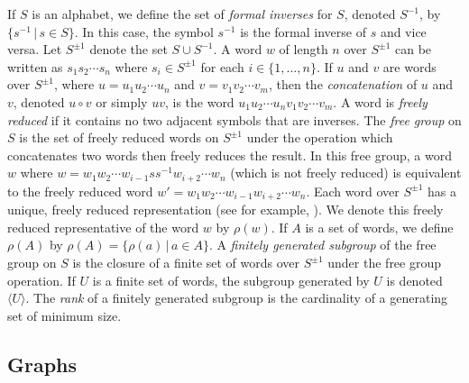 \documentclass{article}
\newcommand{\gen}[1]{\langle #1 \rangle}
\newcommand{\Spm}{S^{\pm1}}
\begin{document}
If $S$ is an alphabet, we define the set of \emph{formal inverses} for $S$, denoted $S^{-1}$, by $\{ s^{-1} \,|\, s \in S \}$.
In this case, the symbol $s^{-1}$ is the formal inverse of $s$ and vice versa.
Let $\Spm$ denote the set $S \cup S^{-1}$.
A word $w$ of length $n$ over $\Spm$ can be written as $s_1s_2\cdots s_n$ where $s_i \in \Spm$ for each $i \in \{1, \dotsc, n\}$.
If $u$ and $v$ are words over $\Spm$, where $u = u_1 u_2 \dotsb u_n$ and $v = v_1 v_2 \dotsb v_m$, then the \emph{concatenation} of $u$ and $v$, denoted $u \circ v$ or simply $uv$, is the word $u_1 u_2 \cdots u_n v_1 v_2 \cdots v_m$.
A word is \emph{freely reduced} if it contains no two adjacent symbols that are inverses.
The \emph{free group} on $S$ is the set of freely reduced words on $\Spm$ under the operation which concatenates two words then freely reduces the result.
In this free group, a word $w$ where $w = w_1 w_2 \cdots w_{i - 1} s s^{-1} w_{i + 2} \cdots w_n$ (which is not freely reduced) is equivalent to the freely reduced word $w' = w_1 w_2 \cdots w_{i - 1} w_{i + 2} \cdots w_n$.
Each word over $\Spm$ has a unique, freely reduced representation (see for example, \cite[Section~I.1]{ls77}).
We denote this freely reduced representative of the word $w$ by $\rho(w)$.
If $A$ is a set of words, we define $\rho(A)$ by $\rho(A) = \{ \rho(a) \, | \, a \in A\}$.
A \emph{finitely generated subgroup} of the free group on $S$ is the closure of a finite set of words over $\Spm$ under the free group operation.
If $U$ is a finite set of words, the subgroup generated by $U$ is denoted $\gen{U}$.
The \emph{rank} of a finitely generated subgroup is the cardinality of a generating set of minimum size.

\subsection{Graphs}
\end{document}
